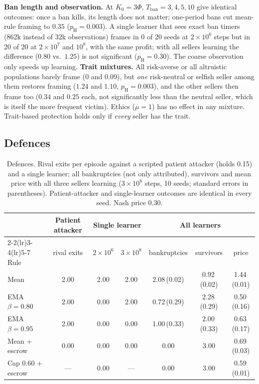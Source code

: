 \documentclass{article}
\newcommand{\Tban}{T_{\mathrm{ban}}}
\newcommand{\se}[1]{\,{\scriptsize(#1)}}
\begin{document}
\textbf{Ban length and observation.} At $K_0=3\Phi$, $\Tban=3,4,5,10$ give identical outcomes: once a ban kills, its length does not matter; one-period bans cut mean-rule framing to $0.35$ ($p_{\mathrm H}=0.003$). A single learner that sees exact ban timers (862k instead of 32k observations) frames in 0 of 20 seeds at $2\times10^6$ steps but in 20 of 20 at $2\times10^7$ and $10^8$, with the same profit; with all sellers learning the difference ($0.80$ vs.\ $1.25$) is not significant ($p_{\mathrm H}=0.30$). The coarse observation only speeds up learning. \textbf{Trait mixtures.} All risk-averse or all altruistic populations barely frame ($0$ and $0.09$), but \emph{one} risk-neutral or selfish seller among them restores framing ($1.24$ and $1.10$, $p_{\mathrm H}=0.003$), and the other sellers then frame too ($0.34$ and $0.25$ each, not significantly less than the neutral seller, which is itself the more frequent victim). Ethics ($\mu=1$) has no effect in any mixture. Trait-based protection holds only if \emph{every} seller has the trait.

\subsection{Defences}

\begin{table}[t]
\centering
\caption{Defences. Rival exits per episode against a scripted patient attacker (holds 0.15) and a single learner; all bankruptcies (not only attributed), survivors and mean price with all three sellers learning ($3\times10^8$ steps, 10 seeds; standard errors in parentheses). Patient-attacker and single-learner outcomes are identical in every seed. Nash price 0.30.}
\label{tab:defences}
\small
\begin{tabular}{@{}lcccccc@{}}
\toprule
& Patient attacker & \multicolumn{2}{c}{Single learner} & \multicolumn{3}{c}{All learners} \\
\cmidrule(lr){2-2}\cmidrule(lr){3-4}\cmidrule(lr){5-7}
Rule & rival exits & $2\times10^6$ & $3\times10^8$ & bankruptcies & survivors & price \\
\midrule
Mean & 2.00 & 2.00 & 2.00 & 2.08\se{0.02} & 0.92\se{0.02} & 1.44\se{0.01} \\
EMA $\beta{=}0.80$ & 2.00 & 0.00 & 2.00 & 0.72\se{0.29} & 2.28\se{0.29} & 0.50\se{0.16} \\
EMA $\beta{=}0.95$ & 2.00 & 0.00 & 0.00 & 1.00\se{0.33} & 2.00\se{0.33} & 0.63\se{0.17} \\
Mean + escrow & 0.00 & 0.00 & 0.00 & 0.00 & 3.00 & 0.69\se{0.03} \\
Cap 0.60 + escrow & --- & 0.00 & --- & 0.00 & 3.00 & 0.59\se{0.01} \\
\bottomrule
\end{tabular}
\end{table}
\end{document}
